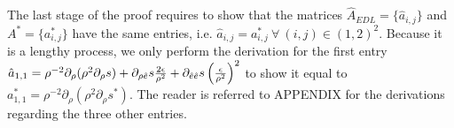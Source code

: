 \documentclass[times,doublespace]{fldauth}%
\begin{document}
The last stage of the proof requires to show that the matrices $\hat{A}_{EDL} = \{ \hat{a}_{i,j} \}$ and $A^* = \{a^*_{i,j} \}$ have the same entries, i.e. $\hat{a}_{i,j} = a^*_{i,j} \ \forall \ (i,j) \in (1,2)^2$. Because it is a lengthy process, we only perform the derivation for the first entry $\hat{a}_{1,1} = \rho^{-2}\partial_{\rho}(\rho^2 \partial_{\rho} s) + \partial_{\rho \hat{e}} s\frac{2 \epsilon}{\rho^2} + \partial_{\hat{e} \hat{e}} s \left(\frac{\epsilon}{\rho^2}\right)^2$ to show it equal to $a^*_{1,1} = \rho^{-2}\partial_{\rho} \left( \rho^2 \partial_{\rho} s^* \right)$. The reader is referred to APPENDIX for the derivations regarding the three other entries.
%
\end{document}
